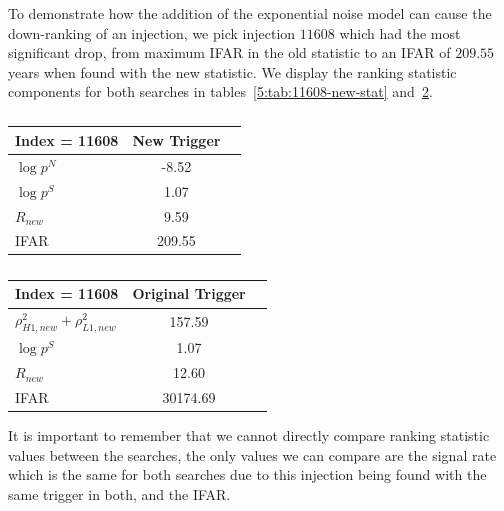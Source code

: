 To demonstrate how the addition of the exponential noise model can cause the down-ranking of an injection, we pick injection $11608$ which had the most significant drop, from maximum IFAR in the old statistic to an IFAR of $209.55$ years when found with the new statistic. We display the ranking statistic components for both searches in tables~\ref{5:tab:11608-new-stat} and~\ref{5:tab:11608-old-stat}.
%
\begin{table}[ht]
    \centering
    \setlength{\tabcolsep}{4pt}
    \begin{minipage}{0.48\textwidth}
        \centering
        \begin{adjustbox}{minipage=\linewidth-0cm, margin=0.5cm 0cm 0cm 0cm}
        \begin{tabular}{lcc}
            \toprule
            \textbf{Index = 11608} & \textbf{New Trigger} \\
            \midrule
            $\log p^{N}$  & -8.52 \\
            $\log p^{S}$ & 1.07 \\
            $R_{new}$ & 9.59 \\
            IFAR & 209.55 \\
            \bottomrule
        \end{tabular}
        \end{adjustbox}
        \caption{}
        \label{5:tab:11608-new-stat}
    \end{minipage}
    \hfill
    \begin{minipage}{0.48\textwidth}
        \centering
        \begin{tabular}{lcc}
            \toprule
            \textbf{Index = 11608} & \textbf{Original Trigger}\\
            \midrule
            $\rho_{H1,new}^2 + \rho_{L1,new}^2$   & 157.59 \\
            $\log p^{S}$ & 1.07 \\
            $R_{new}$ & 12.60 \\
            IFAR & 30174.69 \\
            \bottomrule
        \end{tabular}
        \caption{}
        \label{5:tab:11608-old-stat}
    \end{minipage}
\end{table}
%
It is important to remember that we cannot directly compare ranking statistic values between the searches, the only values we can compare are the signal rate which is the same for both searches due to this injection being found with the same trigger in both, and the IFAR.

